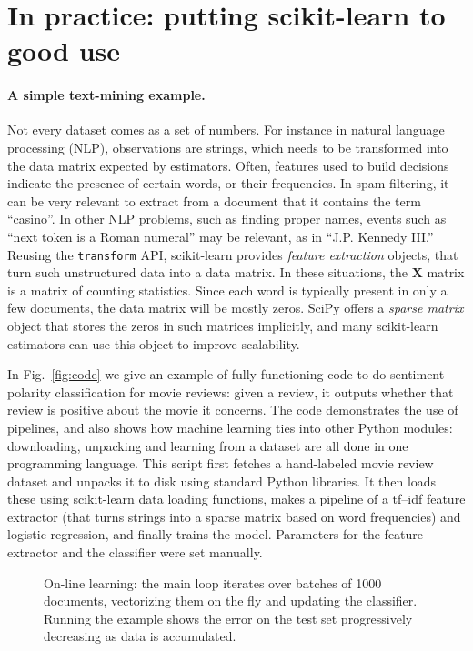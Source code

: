 \documentclass[a4paper]{article}
\begin{document}
\section{In practice: putting scikit-learn to good use}

\paragraph{A simple text-mining example.}
%
Not every dataset comes as a set of numbers. For instance in natural
language processing (NLP), observations are strings,
which needs to be transformed into the data matrix expected by
estimators. Often, features used to build decisions indicate the
presence of certain words, or their frequencies.
In spam filtering, it can be very relevant to extract from a document that
it contains the term ``casino''.
In other NLP problems, such as finding proper names,
events such as ``next token is a Roman numeral'' may be relevant, as in
``J.P. Kennedy III.''
Reusing the {\tt transform} API, scikit-learn
provides \emph{feature extraction} objects, that turn such
unstructured data into a data matrix. In these situations, the
$\textbf{X}$ matrix is a matrix of counting statistics.
Since each word is typically present in only a few documents,
the data matrix will be mostly zeros.
SciPy offers a \emph{sparse matrix} object
that stores the zeros in such matrices implicitly,
and many scikit-learn estimators can use this object to improve scalability.

In Fig.~\ref{fig:code} we give an example of fully functioning code to
do sentiment polarity classification for movie reviews: given a review,
it outputs whether that review is positive about the movie it concerns.
The code demonstrates the use of pipelines, and also shows how machine
learning ties into other Python modules: downloading, unpacking and
learning from a dataset are all done in one programming language.
This script first fetches a hand-labeled movie review dataset
\cite{pang2004} and unpacks it to disk using standard Python libraries.
It then loads these using scikit-learn data loading functions, makes a
pipeline of a \textsf{tf--idf} feature extractor
\cite{rennie2003tackling} (that turns strings into a sparse matrix based
on word frequencies) and logistic regression, and finally trains the
model. Parameters for the feature extractor and the classifier
were set manually.

\begin{figure}[b]

\caption{On-line learning: the main loop iterates over batches
of 1000 documents, vectorizing them on the fly and updating the
classifier. Running the example shows the error on the test set
progressively decreasing as data is accumulated.\label{fig:online}}
\end{figure}
\end{document}
